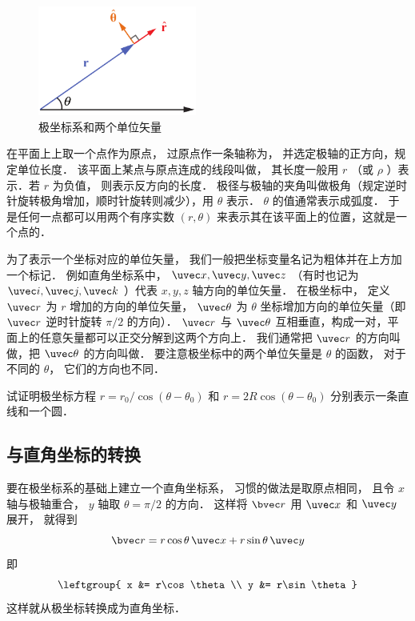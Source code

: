 
\begin{figure}[ht]
\centering
\includegraphics[width=5.2cm]{./figures/Polar1.pdf}
\caption{极坐标系和两个单位矢量}
\end{figure}

在平面上上取一个点作为原点， 过原点作一条轴称为， 并选定极轴的正方向，规定单位长度． 该平面上某点与原点连成的线段叫做， 其长度一般用 $r$ （或 $\rho$ ）表示．若 $r$ 为负值， 则表示反方向的长度． 极径与极轴的夹角叫做极角（规定逆时针旋转极角增加，顺时针旋转则减少），用 $\theta $ 表示． $\theta$ 的值通常表示成弧度． 于是任何一点都可以用两个有序实数 $(r,\theta)$ 来表示其在该平面上的位置，这就是一个点的．

为了表示一个坐标对应的单位矢量， 我们一般把坐标变量名记为粗体并在上方加一个标记． 例如直角坐标系中， $\uvec x, \uvec y, \uvec z$ （有时也记为 $\uvec i, \uvec j, \uvec k$ ）代表 $x,y,z$ 轴方向的单位矢量． 在极坐标中， 定义 $\uvec r$ 为 $r$ 增加的方向的单位矢量， $\uvec \theta$ 为 $\theta$ 坐标增加方向的单位矢量（即 $\uvec r$ 逆时针旋转 $\pi/2$ 的方向）． $\uvec r$ 与 $\uvec \theta$ 互相垂直，构成一对，平面上的任意矢量都可以正交分解到这两个方向上． 我们通常把 $\uvec r$ 的方向叫做，把 $\uvec \theta $ 的方向叫做． 要注意极坐标中的两个单位矢量是 $\theta$ 的函数， 对于不同的 $\theta$， 它们的方向也不同．

\begin{exercise}{}
试证明极坐标方程 $r = r_0/\cos(\theta - \theta_0)$ 和 $r = 2R\cos(\theta - \theta_0)$ 分别表示一条直线和一个圆．
\end{exercise}

\subsection{与直角坐标的转换}
要在极坐标系的基础上建立一个直角坐标系， 习惯的做法是取原点相同， 且令 $x$ 轴与极轴重合， $y$ 轴取 $\theta = \pi/2$ 的方向． 这样将 $\bvec r$ 用 $\uvec x$ 和 $\uvec y$ 展开， 就得到
\begin{equation}
\bvec r = r\cos\theta\,\uvec x + r\sin\theta\,\uvec y
\end{equation}
即
\begin{equation}\label{Polar_eq2}
\leftgroup{
x &= r\cos\theta\\
y &= r\sin\theta}
\end{equation}
这样就从极坐标转换成为直角坐标．

